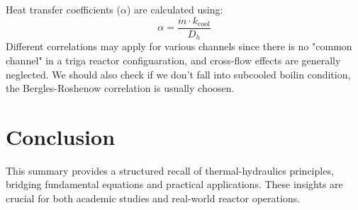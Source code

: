 Heat transfer coefficients ($\alpha$) are calculated using:
\[
\alpha = \frac{\dot{m} \cdot k_{\text{cool}}}{D_h}
\]
Different correlations may apply for various channels since there is no "common channel" in a triga reactor configuaration, and cross-flow effects are generally neglected.
We should also check if we don't fall into subcooled boilin condition, the Bergles-Roshenow correlation is usually choosen.
\section*{Conclusion}

This summary provides a structured recall of thermal-hydraulics principles, bridging fundamental equations and practical applications. These insights are crucial for both academic studies and real-world reactor operations.
